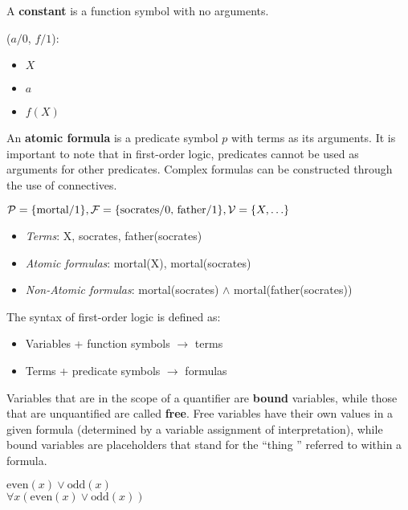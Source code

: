 \documentclass{article}
\begin{document}
A \textbf{constant} is a function symbol with no arguments.
\begin{example}
    ($a/0$, $f/1$):
    \begin{itemize}
        \item $X$
        \item $a$ 
        \item $f(X)$
    \end{itemize}
\end{example}
An \textbf{atomic formula} is a predicate symbol $p$ with terms as its arguments. It
is important to note that in first-order logic, predicates cannot be used as
arguments for other predicates. Complex formulas can be constructed through
the use of connectives.
\begin{example}
    $\mathcal{P}=\{\text{mortal/1}\},\mathcal{F}=\{\text{socrates/0,\ \text{father}/1}\},\mathcal{V}=\{X,\ldots\}$
    \begin{itemize}
        \item \textit{Terms}: X, socrates, father(socrates)
        \item \textit{Atomic formulas}: mortal(X), mortal(socrates)
        \item \textit{Non-Atomic formulas}: mortal(socrates) $\land$
        mortal(father(socrates))
    \end{itemize}
\end{example}
The syntax of first-order logic is defined as:
\begin{itemize}
    \item Variables + function symbols $\to$ terms
    \item Terms + predicate symbols $\to$ formulas
\end{itemize}
Variables that are in the scope of a quantifier are \textbf{bound} variables,
while those that are unquantified are called \textbf{free}. Free variables
have their own values in a given formula (determined by a variable assignment
of interpretation), while bound variables are placeholders that stand for the
``thing '' referred to within a formula.

\begin{example}
    $\text{even}(x)\lor\text{odd}(x)$\\
    $\forall x(\text{even}(x)\lor\text{odd}(x))$
\end{example}

\clearpage
\end{document}
